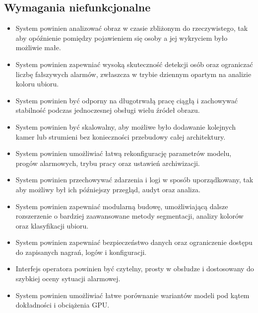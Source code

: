 \subsection{Wymagania niefunkcjonalne}
\begin{itemize}
\item System powinien analizować obraz w czasie zbliżonym do rzeczywistego, tak aby opóźnienie pomiędzy pojawieniem się osoby a jej wykryciem było możliwie małe.
\item System powinien zapewniać wysoką skuteczność detekcji osób oraz ograniczać liczbę fałszywych alarmów, zwłaszcza w trybie dziennym opartym na analizie koloru ubioru.
\item System powinien być odporny na długotrwałą pracę ciągłą i zachowywać stabilność podczas jednoczesnej obsługi wielu źródeł obrazu.
\item System powinien być skalowalny, aby możliwe było dodawanie kolejnych kamer lub strumieni bez konieczności przebudowy całej architektury.
\item System powinien umożliwiać łatwą rekonfigurację parametrów modelu, progów alarmowych, trybu pracy oraz ustawień archiwizacji.
\item System powinien przechowywać zdarzenia i logi w sposób uporządkowany, tak aby możliwy był ich późniejszy przegląd, audyt oraz analiza.
\item System powinien zapewniać modularną budowę, umożliwiającą dalsze rozszerzenie o bardziej zaawansowane metody segmentacji, analizy kolorów oraz klasyfikacji ubioru.
\item System powinien zapewniać bezpieczeństwo danych oraz ograniczenie dostępu do zapisanych nagrań, logów i konfiguracji.
\item Interfejs operatora powinien być czytelny, prosty w obsłudze i dostosowany do szybkiej oceny sytuacji alarmowej.
\item System powinien umożliwiać łatwe porównanie wariantów modeli pod kątem dokładności i obciążenia GPU.
\end{itemize}
